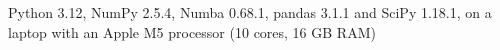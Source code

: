 Python 3.12, NumPy 2.5.4, Numba 0.68.1, pandas 3.1.1 and SciPy 1.18.1, on a laptop with an Apple M5 processor (10 cores, 16 GB RAM)